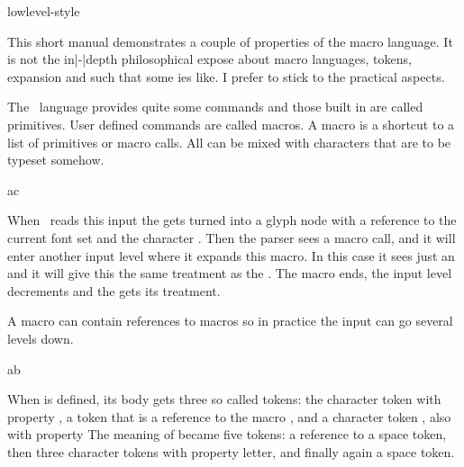 
\environment lowlevel-style

\startdocument
  [title=expansion,
   color=middleyellow]

\startsection[title=Preamble]


This short manual demonstrates a couple of properties of the macro language. It
is not the in|-|depth philosophical expose about macro languages, tokens,
expansion and such that some \TEX ies like. I prefer to stick to the practical
aspects.

\stopsection

\startsection[title={\TEX\ primitives}]

The \TEX\ language provides quite some commands and those built in are called
primitives. User defined commands are called macros. A macro is a shortcut to a
list of primitives or macro calls. All can be mixed with characters that are to
be typeset somehow.

\starttyping[option=TEX]

a\MyMacro c
\stoptyping

When \TEX\ reads this input the  gets turned into a glyph node with a
reference to the current font set and the character . Then the parser
sees a macro call, and it will enter another input level where it expands this
macro. In this case it sees just an  and it will give this the same
treatment as the . The macro ends, the input level decrements and the
 gets its treatment.

A macro can contain references to macros so in practice the input can go several
levels down.

\starttyping[option=TEX]
\def\MyMacroB{1\MyMacroA 2}

a\MyMacroA b
\stoptyping

When \type {\MyMacroB} is defined, its body gets three so called tokens: the
character token  with property , a token that is a
reference to the macro \type {\MyMacroB}, and a character token , also
with property  The meaning of \type {\MyMacroA} became five tokens:
a reference to a space token, then three character tokens with property \quote
{letter}, and finally again a space token.

\starttyping[option=TEX]
\edef\MyMacroB{1\MyMacroA 2}


